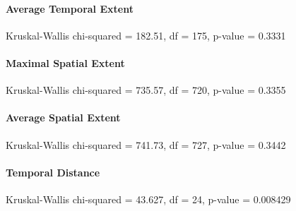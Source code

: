 \paragraph{Average Temporal Extent}
Kruskal-Wallis chi-squared = 182.51, df = 175, p-value = 0.3331
\paragraph{Maximal Spatial Extent}
Kruskal-Wallis chi-squared = 735.57, df = 720, p-value = 0.3355
\paragraph{Average Spatial Extent}
Kruskal-Wallis chi-squared = 741.73, df = 727, p-value = 0.3442
\paragraph{Temporal Distance}
Kruskal-Wallis chi-squared = 43.627, df = 24, p-value = 0.008429

